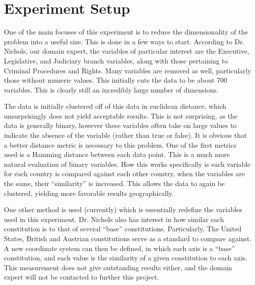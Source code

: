 \documentclass{article}
\begin{document}
\section{Experiment Setup}
One of the main focuses of this experiment is to reduce the dimensionality of the problem into a useful size. This is done in a few ways to start. According to Dr. Nichols, our domain expert, the variables of particular interest are the Executive, Legislative, and Judiciary branch variables, along with those pertaining to Criminal Procedures and Rights. Many variables are removed as well, particularly those without numeric values. This initially cuts the data to be about 700 variables. This is clearly still an incredibly large number of dimensions.

The data is initially clustered off of this data in euclidean distance, which unsurprisingly does not yield acceptable results. This is not surprising, as the data is generally binary, however these variables often take on large values to indicate the absence of the variable (rather than true or false). It is obvious that a better distance metric is necessary to this problem. One of the first metrics used is a Hamming distance between each data point. This is a much more natural evaluation of binary variables. How this works specifically is each variable for each country is compared against each other country, when the variables are the same, their ``similarity'' is increased. This allows the data to again be clustered, yielding more favorable results geographically. 

One other method is used (currently) which is essentially redefine the variables used in this experiment. Dr. Nichols also has interest in how similar each constitution is to that of several ``base'' constitutions. Particularly, The United States, British and Austrian constitutions serve as a standard to compare against. A new coordinate system can then be defined, in which each axis is a ``base'' constitution, and each value is the similarity of a given constitution to each axis. This measurement does not give outstanding results either, and the domain expert will not be contacted to further this project.

\nocite{HD-Clustering}



\end{document}
